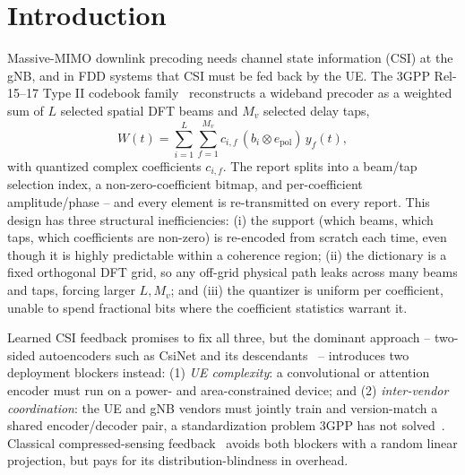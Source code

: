 \documentclass[conference]{IEEEtran}
\begin{document}
\section{Introduction}
Massive-MIMO downlink precoding needs channel state information (CSI) at the gNB, and in FDD systems that CSI must be fed back by the UE. The 3GPP Rel-15--17 Type II codebook family~\cite{3gpp38214} reconstructs a wideband precoder as a weighted sum of $L$ selected spatial DFT beams and $M_v$ selected delay taps,
\begin{equation}
W(t) = \sum_{i=1}^{L}\sum_{f=1}^{M_v} c_{i,f}\,(b_i \otimes e_{\mathrm{pol}})\, y_f(t),
\label{eq:type2}
\end{equation}
with quantized complex coefficients $c_{i,f}$. The report splits into a beam/tap selection index, a non-zero-coefficient bitmap, and per-coefficient amplitude/phase -- and every element is re-transmitted on every report. This design has three structural inefficiencies: (i) the support (which beams, which taps, which coefficients are non-zero) is re-encoded from scratch each time, even though it is highly predictable within a coherence region; (ii) the dictionary is a fixed orthogonal DFT grid, so any off-grid physical path leaks across many beams and taps, forcing larger $L,M_v$; and (iii) the quantizer is uniform per coefficient, unable to spend fractional bits where the coefficient statistics warrant it.

Learned CSI feedback promises to fix all three, but the dominant approach -- two-sided autoencoders such as CsiNet and its descendants~\cite{wen2018csinet,guo2020csinetplus,lu2020crnet,cui2022transnet} -- introduces two deployment blockers instead: (1) \emph{UE complexity}: a convolutional or attention encoder must run on a power- and area-constrained device; and (2) \emph{inter-vendor coordination}: the UE and gNB vendors must jointly train and version-match a shared encoder/decoder pair, a standardization problem 3GPP has not solved~\cite{guo2022overview}. Classical compressed-sensing feedback~\cite{kuo2012compressive,rao2014distributed} avoids both blockers with a random linear projection, but pays for its distribution-blindness in overhead.
\end{document}
